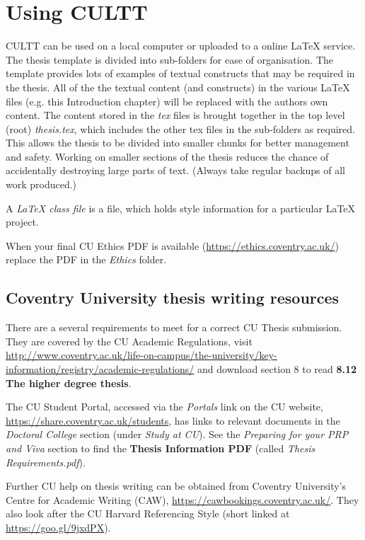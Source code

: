 \section{Using CULTT} %

CULTT can be used on a local computer or uploaded to a online \LaTeX{} service. The thesis template is divided into sub-folders for ease of organisation. The template provides lots of examples of textual constructs that may be required in the thesis. All of the the textual content (and constructs) in the various \LaTeX{} files (e.g. this Introduction chapter) will be replaced with the authors own content. The content stored in the \emph{tex} files is brought together in the top level (root) \emph{thesis.tex}, which includes the other tex files in the sub-folders as required. This allows the thesis to be divided into smaller chunks for better management and safety. Working on smaller sections of the thesis reduces the chance of accidentally destroying large parts of text. (Always take regular backups of all work produced.)

A \emph{\LaTeX{} class file} is a file, which holds style information for a particular \LaTeX{} project.

When your final CU Ethics PDF is available (\url{https://ethics.coventry.ac.uk/}) replace the PDF in the \emph{Ethics} folder.

\subsection{Coventry University thesis writing resources}

There are a several requirements to meet for a correct CU Thesis submission. They are covered by the CU Academic Regulations, visit \url{http://www.coventry.ac.uk/life-on-campus/the-university/key-information/registry/academic-regulations/} and download section 8 to read \textbf{8.12 The higher degree thesis}. 

The CU Student Portal, accessed via the \emph{Portals} link on the CU website, \url{https://share.coventry.ac.uk/students}, has links to relevant documents in the \emph{Doctoral College} section (under \emph{Study at CU}). See the \emph{Preparing for your PRP and Viva} section to find the \textbf{Thesis Information PDF} (called \emph{Thesis Requirements.pdf}).

Further CU help on thesis writing can be obtained from Coventry University's Centre for Academic Writing (CAW), \url{https://cawbookings.coventry.ac.uk/}. They also look after the CU Harvard Referencing Style (short linked at \url{https://goo.gl/9jxdPX}).
